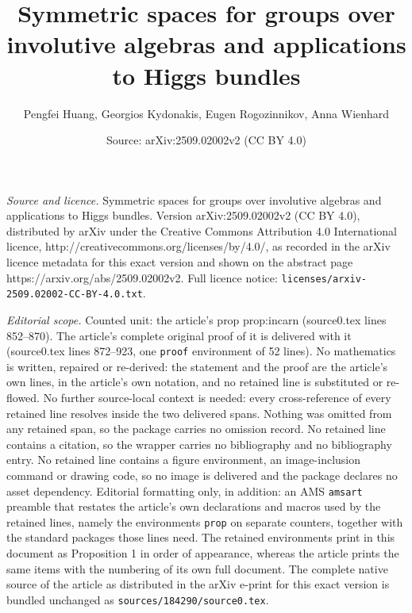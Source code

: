 \documentclass[10pt,a4paper]{amsart}
\title{Symmetric spaces for groups over involutive algebras and applications to Higgs bundles}
\author{Pengfei Huang, Georgios Kydonakis, Eugen Rogozinnikov, Anna Wienhard}
\date{Source: arXiv:2509.02002v2 (CC BY 4.0)}
\begin{document}
\maketitle

\noindent\emph{Source and licence.} Symmetric spaces for groups over involutive algebras and applications to Higgs bundles. Version arXiv:2509.02002v2 (CC BY 4.0), distributed by arXiv under the Creative Commons Attribution 4.0 International licence, http://creativecommons.org/licenses/by/4.0/, as recorded in the arXiv licence metadata for this exact version and shown on the abstract page https://arxiv.org/abs/2509.02002v2. Full licence notice: \texttt{licenses/arxiv-2509.02002-CC-BY-4.0.txt}.\par\smallskip

\noindent\textit{Editorial scope.} Counted unit: the article's prop prop:incarn (source0.tex lines 852--870). The article's complete original proof of it is delivered with it (source0.tex lines 872--923, one \texttt{proof} environment of 52 lines). No mathematics is written, repaired or re-derived: the statement and the proof are the article's own lines, in the article's own notation, and no retained line is substituted or re-flowed.  No further source-local context is needed: every cross-reference of every retained line resolves inside the two delivered spans.  Nothing was omitted from any retained span, so the package carries no omission record.  No retained line contains a citation, so the wrapper carries no bibliography and no bibliography entry.  No retained line contains a figure environment, an image-inclusion command or drawing code, so no image is delivered and the package declares no asset dependency.  Editorial formatting only, in addition: an AMS \texttt{amsart} preamble that restates the article's own declarations and macros used by the retained lines, namely the environments \texttt{prop} on separate counters, together with the standard packages those lines need.  The retained environments print in this document as Proposition 1 in order of appearance, whereas the article prints the same items with the numbering of its own full document.  The complete native source of the article as distributed in the arXiv e-print for this exact version is bundled unchanged as \texttt{sources/184290/source0.tex}.
\end{document}
